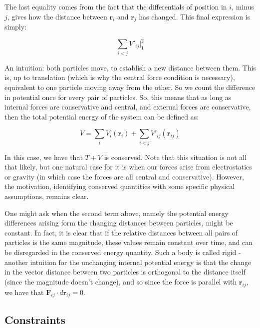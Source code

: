\documentclass{article}
\begin{document}
The last equality comes from the fact that the differentials of position in $i$, minus $j$, gives how the distance between $\mathbf{r}_i$ and $\mathbf{r}_j$ has changed. This final expression is simply:

$$
\sum_{i<j} V'_{ij}\Big\vert_1^2
$$

An intuition: both particles move, to establish a new distance between them. This is, up to translation (which is why the central force condition is necessary), equivalent to one particle moving away from the other. So we count the difference in potential once for every pair of particles. So, this means that as long as internal forces are conservative and central, and external forces are conservative, then the total potential energy of the system can be defined as:

$$
V = \sum_i V_i(\mathbf{r}_i) + \sum_{i<j} V'_{ij}(\mathbf{r}_{ij})
$$

In this case, we have that $T+V$ is conserved. Note that this situation is not all that likely, but one natural case for it is when our forces arise from electrostatics or gravity (in which case the forces are all central and conservative). However, the motivation, identifying conserved quantities with some specific physical assumptions, remains clear. 

One might ask when the second term above, namely the potential energy differences arising form the changing distances between particles, might be constant. In fact, it is clear that if the relative distances between all pairs of particles is the same magnitude, these values remain constant over time, and can be disregarded in the conserved energy quantity. Such a body is called rigid - another intuition for the unchanging internal potential energy is that the change in the vector distance between two particles is orthogonal to the distance itself (since the magnitude doesn’t change), and so since the force is parallel with $\mathbf{r}_{ij}$, we have that $\mathbf{F}_{ij} \cdot d\mathbf{r}_{ij}= 0$.




\subsection{Constraints}
\end{document}
